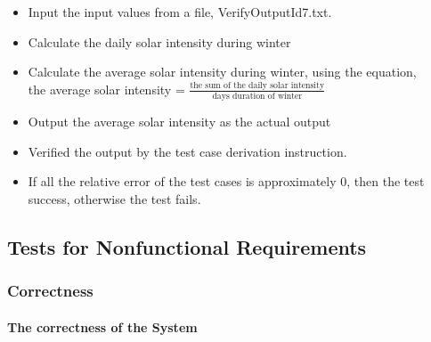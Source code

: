 \documentclass[12pt, titlepage]{article}
\begin{document}
\begin{enumerate}
\begin{itemize} 
\item Input the input values from a file, VerifyOutputId7.txt. 
\item Calculate the daily solar intensity during winter 
\item Calculate the average solar intensity during winter, using the equation,\\the average solar intensity = $\frac{\text{the sum of the daily solar
intensity}}{\text{days duration of winter}}$
\item Output the average solar intensity as the actual output
\item Verified the output by the test case derivation instruction. 
\item If all the relative error of the test cases is approximately 0, then the
test success, otherwise the test fails.
\end{itemize}
\end{enumerate}

\subsection{Tests for Nonfunctional Requirements}

  \subsubsection{Correctness}
\paragraph{The correctness of the System}
\end{document}
